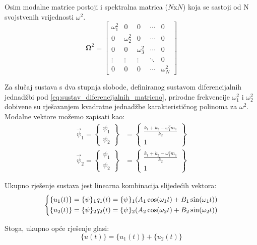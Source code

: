 \documentclass{rgn}
\newcommand\ffrac[2]{\frac{\displaystyle #1}{\displaystyle #2}}
\newcommand\oomega{\mathbf{\Omega}}
\begin{document}
Osim modalne matrice postoji i spektralna matrica ($N$x$N$) koja se sastoji od N
svojstvenih vrijednosti $\omega^2$.
\[
	\oomega^2 
	= 
	\begin{bmatrix}
		\omega_1^2 & 0 & 0 & \cdots & 0 \\
		0 & \omega_2^2 & 0 & \cdots & 0 \\
		0 & 0 & \omega_3^2 & \cdots & 0 \\
		\vdots  & \vdots  & \vdots  & \ddots &  0 \\
		0 & 0 & 0 & \cdots &  \omega_N^2 
	\end{bmatrix}
\]


Za slučaj sustava s dva stupnja slobode, definiranog sustavom diferencijalnih
jednadžbi pod \eqref{eq:sustav_diferencijalnih_matricno}, prirodne frekvencije 
$\omega_1^2$ i $\omega_2^2$ dobivene su rješavanjem kvadratne jednadžbe karakterističnog
polinoma za $\omega^2$. Modalne vektore možemo zapisati kao:
\begin{align}
    \overrightarrow{\psi}_1=
    \begin{Bmatrix}
        \psi_1\\
        \psi_2
    \end{Bmatrix}
    &=
    \begin{Bmatrix}
        \ffrac{k_1+k_2-\omega_1^2m_1}{k_2}\\
        1
    \end{Bmatrix}\\
    \overrightarrow{\psi}_2=
    \begin{Bmatrix}
        \psi_1\\
        \psi_2
    \end{Bmatrix}
    &=
    \begin{Bmatrix}
        \ffrac{k_1+k_2-\omega_1^2m_1}{k_2}\\
        1
    \end{Bmatrix}
\end{align}

Ukupno rješenje sustava jest linearna kombinacija slijedećih vektora:
\begin{equation}
    \begin{dcases}
        \{u_1(t)\} = \{\psi\}_1 q_1(t) = \{\psi\}_1 (A_1\cos(\omega_1 t) + B_1\sin(\omega_1 t))\\
        \{u_2(t)\} = \{\psi\}_2 q_2(t) = \{\psi\}_2 (A_2\cos(\omega_2 t) + B_2\sin(\omega_2 t))
    \end{dcases}
\end{equation}

Stoga, ukupno opće rješenje glasi:
\begin{equation}\label{eq:ukupno_opce_rjesenje_2dof}
    \{u(t)\}=\{u_1(t)\}+\{u_2(t)\}
\end{equation}
\end{document}
